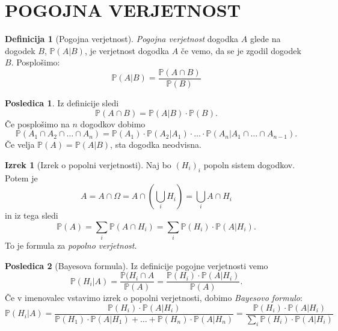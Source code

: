 \documentclass[11pt]{article}
\theoremstyle{definition}
\newtheorem{definicija}{Definicija}[section]
\theoremstyle{definition}
\theoremstyle{definition}
\newtheorem{izrek}{Izrek}[section]
\newtheorem*{posledica}{Posledica}
\begin{document}
\pagebreak


\section{POGOJNA VERJETNOST}
\vspace{0.5cm}

\begin{definicija}[Pogojna verjetnost]

\textit{Pogojna verjetnost} dogodka $A$ glede na dogodek $B$, $\mathbb{P}(A | B)$, je verjetnost dogodka $A$ če vemo, da se je zgodil dogodek $B$.
Posplošimo:
$$\mathbb{P}(A | B) = \frac{\mathbb{P}(A \cap B)}{\mathbb{P}(B)}$$

\end{definicija}
\vspace{0.5cm}

\begin{posledica}

Iz definicije sledi
$$\mathbb{P}(A \cap B) = \mathbb{P}(A | B) \cdot \mathbb{P}(B).$$
Če posplošimo na $n$ dogodkov dobimo
$$\mathbb{P}(A_1 \cap A_2 \cap \ldots \cap A_n) = \mathbb{P}(A_1) \cdot \mathbb{P}(A_2 | A_1) \cdot \ldots \cdot \mathbb{P}(A_n | A_1 \cap \ldots \cap A_{n-1}).$$
Če velja $\mathbb{P}(A) = \mathbb{P}(A | B)$, sta dogodka neodvisna.

\end{posledica}
\vspace{0.5cm}

\begin{izrek}[Izrek o popolni verjetnosti]

Naj bo $(H_i)_i$ popoln sistem dogodkov. Potem je 
$$A = A \cap \Omega = A \cap {\left( \bigcup_i H_i \right)} = \bigcup_i A \cap H_i$$
in iz tega sledi
$$\mathbb{P}(A) = \sum_i \mathbb{P}(A \cap H_i) = \sum_i \mathbb{P}(H_i) \cdot \mathbb{P}(A | H_i).$$
To je formula za \textit{popolno verjetnost}.

\end{izrek}
\vspace{0.5cm}

\begin{posledica}[Bayesova formula]

Iz definicije pogojne verjetnosti vemo
$$\mathbb{P}(H_i | A) = \frac{\mathbb{P}(H_i \cap A}{\mathbb{P}(A)} = \frac{\mathbb{P}(H_i) \cdot \mathbb{P}(A | H_i)}{\mathbb{P}(A)}.$$
Če v imenovalec vstavimo izrek o popolni verjetnosti, dobimo \textit{Bayesovo formulo}:
$$\mathbb{P}(H_i | A) = \frac{\mathbb{P}(H_i) \cdot \mathbb{P}(A | H_i)}{\mathbb{P}(H_1) \cdot \mathbb{P}(A | H_1) + \ldots + \mathbb{P}(H_n) \cdot \mathbb{P}(A | H_n)} = \frac{\mathbb{P}(H_i) \cdot \mathbb{P}(A | H_i)}{\sum_i \mathbb{P}(H_i) \cdot \mathbb{P}(A | H_i)}$$

\end{posledica}
\vspace{0.5cm}
\end{document}

